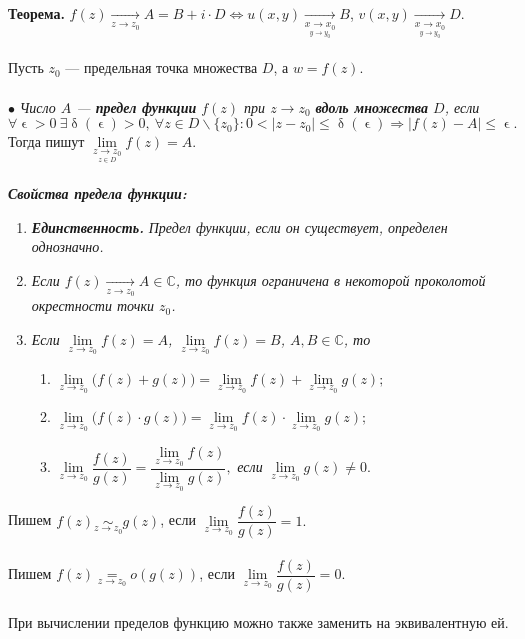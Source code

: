 \documentclass[a4paper, 12pt]{article}
\newcommand{\Cm}{\mathbb{C}}
\renewcommand{\delta}{\updelta}
\renewcommand{\epsilon}{\upvarepsilon}
\newcommand{\limdef}{\forall \epsilon >0\ \exists \delta (\epsilon) > 0}
\begin{document}
\textbf{Теорема.}
	$f(z)\underset{z\to z_0}{\longrightarrow}A = B + i\cdot D \Longleftrightarrow u(x,y)\underset{\underset{y\to y_0}{x\to x_0}
	}{\longrightarrow}B$, $v(x,y)\underset{\underset{y\to y_0}{x\to x_0}}{\longrightarrow}D$.\\\\
Пусть $z_0$ --- предельная точка множества $D$, а $w = f(z)$.\\\\
$\bullet$ \textit{Число $A$ --- \textbf{предел функции} $f(z)$ при $z \to z_0$ \textbf{вдоль множества} $D$, если} $$\limdef,\ \forall z \in D\backslash\{z_0\} : 0 < |z-z_0|\leqslant\delta(\epsilon)\Rightarrow |f(z) - A|\leqslant\epsilon.$$
Тогда пишут $\lim\limits_{\underset{z\in D}{z\to z_0}}f(z) = A$.\\\\
\textit{\textbf{Свойства предела функции:}}\begin{enumerate}
	\item \textbf{\textit{Единственность.}} \textit{Предел функции, если он существует, определен однозначно.}
	\item \textit{Если $f(z)\underset{z\to z_0}{\longrightarrow} A\in \Cm$, то функция ограничена в некоторой проколотой окрестности точки $z_0$.}
	\item \textit{Если $\lim\limits_{z\to z_0}f(z) = A$, $\lim\limits_{z\to z_0}f(z) = B$, $A, B\in\Cm$, то}\begin{enumerate}
		\item $\lim\limits_{z\to z_0}\Big(f(z) + g(z)\Big) = \lim\limits_{z\to z_0}f(z) + \lim\limits_{z\to z_0}g(z);$
		\item $\lim\limits_{z\to z_0}\Big(f(z) \cdot g(z)\Big) = \lim\limits_{z\to z_0}f(z) \cdot  \lim\limits_{z\to z_0}g(z);$
		\item $\lim\limits_{z\to z_0}\dfrac{f(z)}{g(z)} = \dfrac{\lim\limits_{z\to z_0}f(z)}{\lim\limits_{z\to z_0}g(z)},$ \textit{если} $\lim\limits_{z\to z_0}g(z)\ne 0$.
	\end{enumerate}
\end{enumerate}
Пишем $f(z)\underset{z\to z_0}{\sim}g(z)$, если $\lim\limits_{z\to z_0}\dfrac{f(z)}{g(z)} = 1.$\\\\
Пишем $f(z)\underset{z\to z_0}{=}o(g(z))$, если $\lim\limits_{z\to z_0}\dfrac{f(z)}{g(z)} = 0.$\\\\
При вычислении пределов функцию можно также заменить на эквивалентную ей.\\\\
\end{document}
